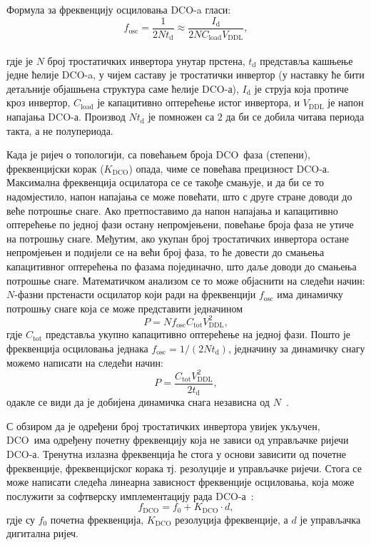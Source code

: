 \documentclass[master]{finthesis}
\def \DCO  {DCO} %
\begin{document}
Формула за фреквенцију осциловања \DCO-a гласи:
\begin{equation} \label{f_osc}
    f_\text{osc} = \dfrac{1}{2Nt_\text{d}} \approx \dfrac{I_\text{d}}{2NC_\text{load}V_\text{DDL}},
\end{equation} \\
гдје је $N$ број тростатичких инвертора унутар прстена, $t_\text{d}$ представља кашњење једне ћелије \DCO-a, у чијем саставу је тростатички инвертор (у наставку ће бити детаљније објашњена структура саме ћелије \DCO-а), $I_\text{d}$ је струја која протиче кроз инвертор, $C_\text{load}$ је капацитивно оптерећење истог инвертора, и $V_\text{DDL}$ је напон напајања \DCO-а. Производ $Nt_\text{d}$ је помножен са $2$ да би се добила читава периода такта, а не полупериода. \par
Када је ријеч о топологији, са повећањем броја \DCO\ фаза (степени), фреквенцијски корак ($K_\text{DCO}$) опада, чиме се повећава прецизност \DCO-а. Максимална фреквенција осцилатора се се такође смањује, и да би се то надомјестило, напон напајања се може повећати, што с друге стране доводи до веће потрошње снаге. Ако претпоставимо да напон напајања и капацитивно оптерећење по једној фази остану непромјењени, повећање броја фаза не утиче на потрошњу снаге. Међутим, ако укупан број тростатичких инвертора остане непромјењен и подијели се на већи број фаза, то ће довести до смањења капацитивног оптерећења по фазама појединачно, што даље доводи до смањења потрошње снаге. Математичком анализом се то може објаснити на следећи начин: $N$-фазни прстенасти осцилатор који ради на фреквенцији $f_\text{osc}$ има динамичку потрошњу снаге која се може представити једначином
\begin{equation} \label{dynamic power}
    	P = N f_\text{osc} C_\text{tot} V^{2}_\text{DDL}, 
\end{equation}
гдје $C_\text{tot}$ представља укупно капацитивно оптерећење на једној фази. Пошто је фреквенција осциловања једнака $f_\text{osc} = 1/(2Nt_\text{d})$, једначину за динамичку снагу можемо написати на следећи начин:
\begin{equation}
    	P = \frac{C_\text{tot}V^{2}_\text{DDL}}{2t_\text{d}},
\end{equation}
одакле се види да је добијена динамичка снага независна од $N$~\cite{Razavi:PLL_CMOS_2020}. \par
С обзиром да је одређени број тростатичких инвертора увијек укључен, \DCO\ има одређену почетну фреквенцију која не зависи од управљачке ријечи \DCO-а. Тренутна излазна фреквенција ће стога у основи зависити од почетне фреквенције, фреквенцијског корака тј. резолуције и управљачке ријечи. Стога се може написати следећа линеарна зависност фреквенције осциловања, која може послужити за софтверску имплементацију рада \DCO-а~:  
\begin{equation} \label{f_dco}
	f_\text{DCO} = f_\text{0} + K_\text{DCO} \cdot d,
\end{equation} 
гдје су $f_\text{0}$ почетна фреквенција, $K_\text{DCO}$ резолуција фреквенције, а $d$ је управљачка дигитална ријеч.
\end{document}

